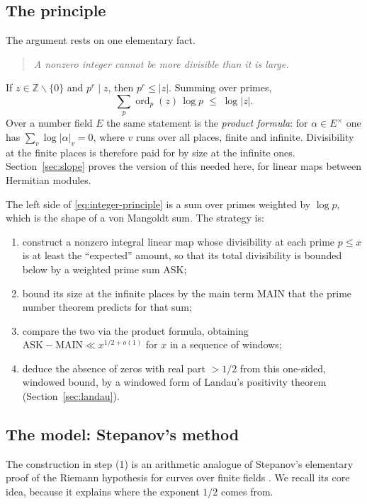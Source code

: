 \documentclass[11pt]{amsart}
\theoremstyle{definition}
\theoremstyle{remark}
\DeclareMathOperator{\ord}{ord}
\newcommand{\Z}{\mathbb{Z}}
\newcommand{\ASK}{\mathrm{ASK}}
\newcommand{\MAIN}{\mathrm{MAIN}}
\begin{document}
\subsection{The principle}
The argument rests on one elementary fact.

\begin{quote}
\emph{A nonzero integer cannot be more divisible than it is large.}
\end{quote}

If $z\in\Z\smallsetminus\{0\}$ and $p^{r}\mid z$, then $p^{r}\le |z|$. Summing over primes,
\begin{equation}\label{eq:integer-principle}
\sum_{p}\ord_p(z)\,\log p\;\le\;\log|z| .
\end{equation}
Over a number field $E$ the same statement is the \emph{product formula}: for $\alpha\in E^{\times}$ one has $\sum_{v}\log|\alpha|_v=0$, where $v$ runs over all places, finite and infinite. Divisibility at the finite places is therefore paid for by size at the infinite ones. Section~\ref{sec:slope} proves the version of this needed here, for linear maps between Hermitian modules.

The left side of \eqref{eq:integer-principle} is a sum over primes weighted by $\log p$, which is the shape of a von Mangoldt sum. The strategy is:
\begin{enumerate}[label=(\arabic*)]
\item construct a nonzero integral linear map whose divisibility at each prime $p\le x$ is at least the ``expected'' amount, so that its total divisibility is bounded below by a weighted prime sum $\ASK$;
\item bound its size at the infinite places by the main term $\MAIN$ that the prime number theorem predicts for that sum;
\item compare the two via the product formula, obtaining $\ASK-\MAIN\ll x^{1/2+o(1)}$ for $x$ in a sequence of windows;
\item deduce the absence of zeros with real part $>1/2$ from this one-sided, windowed bound, by a windowed form of Landau's positivity theorem (Section~\ref{sec:landau}).
\end{enumerate}

\subsection{The model: Stepanov's method}\label{subsec:stepanov}
The construction in step (1) is an arithmetic analogue of Stepanov's elementary proof of the Riemann hypothesis for curves over finite fields \cite{Bombieri-Stepanov}. We recall its core idea, because it explains where the exponent $1/2$ comes from.
\end{document}
